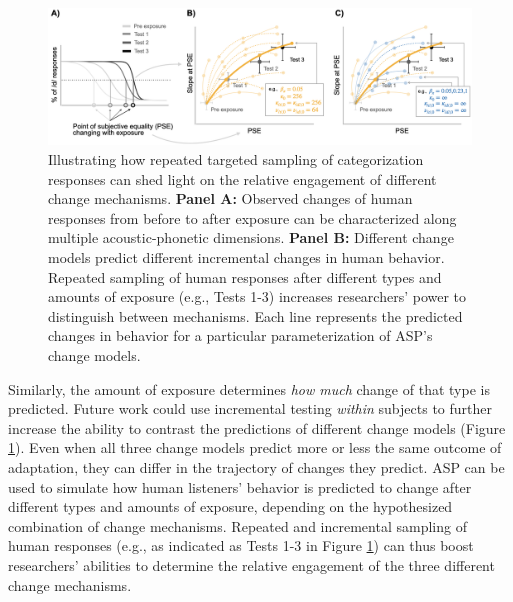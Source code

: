\documentclass[
  11pt,
  man,floatsintext]{apa6}
\begin{document}
\begin{figure}[h]
\begin{center}
\includegraphics[width=1 \columnwidth]{../figures/diagrams/repeated-sampling.png}
\caption{Illustrating how repeated targeted sampling of categorization responses can shed light on the relative engagement of different change mechanisms. {\bf Panel A:} Observed changes of human responses from before to after exposure can be characterized along multiple acoustic-phonetic dimensions. {\bf Panel B:} Different change models predict different incremental changes in human behavior. Repeated sampling of human responses after different types and amounts of exposure (e.g., Tests 1-3) increases researchers' power to distinguish between mechanisms. Each line represents the predicted changes in behavior for a particular parameterization of ASP's change models.}\label{fig:repeated-sampling}
\end{center}
\end{figure}

Similarly, the amount of exposure determines \emph{how much} change of that type is predicted.
Future work could use incremental testing \emph{within} subjects to further increase the ability to contrast the predictions of different change models (Figure \ref{fig:repeated-sampling}). Even when all three change models predict more or less the same outcome of adaptation, they can differ in the trajectory of changes they predict. ASP can be used to simulate how human listeners' behavior is predicted to change after different types and amounts of exposure, depending on the hypothesized combination of change mechanisms. Repeated and incremental sampling of human responses (e.g., as indicated as Tests 1-3 in Figure \ref{fig:repeated-sampling}) can thus boost researchers' abilities to determine the relative engagement of the three different change mechanisms.
\end{document}
